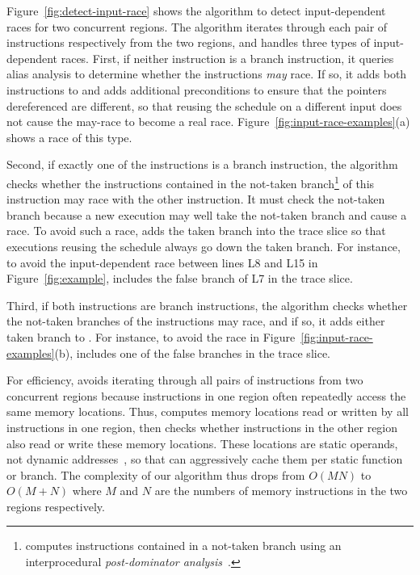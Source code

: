 Figure~\ref{fig:detect-input-race} shows the algorithm to detect
input-dependent races for two concurrent regions.  The algorithm iterates
through each pair of instructions respectively from the
two regions, and handles three types of input-dependent races.  First, if
neither instruction is a branch instruction, it queries alias analysis to
determine whether the instructions \emph{may} race.  If so, it adds both
instructions to  and adds additional
preconditions to ensure that the pointers dereferenced are different, so
that reusing the schedule on a different input does not cause the may-race
to become a real race.  Figure~\ref{fig:input-race-examples}(a) shows
a race of this type.

Second, if exactly one of the instructions is a branch instruction, the
algorithm checks whether the instructions contained in the not-taken
branch\footnote{\peregrine computes instructions contained in a not-taken
  branch using an interprocedural \emph{post-dominator
    analysis}~\cite{aho:dragon:06}.} of this instruction may race with the
other instruction.
It must check the not-taken branch because a new
execution may well take the not-taken branch and cause a race.  To avoid such a
race, \peregrine adds the taken branch into the trace slice so that executions
reusing the schedule always go down the taken branch.  For instance, to
avoid the input-dependent race between lines L8 and L15
in Figure~\ref{fig:example}, \peregrine includes
the false branch of L7 in the trace slice.

Third, if both instructions are branch instructions, the algorithm checks
whether the not-taken branches of the instructions may race, and if so, it
adds either taken branch to .
For instance, to avoid the race in Figure~\ref{fig:input-race-examples}(b),
\peregrine includes one of the false branches in the trace slice.

For efficiency, \peregrine avoids iterating through all pairs of instructions
from two concurrent regions because instructions in one region often
repeatedly access the same memory locations.  Thus, \peregrine computes memory
locations read or written by all instructions in one region, then checks
whether instructions in the other region also read or write these memory
locations.  These locations are static operands, not dynamic
addresses~\cite{rwset:tacas08}, so that \peregrine can aggressively cache them
per static function or branch.  The complexity of our algorithm thus drops from
$O(MN)$ to $O(M+N)$ where $M$ and $N$ are the numbers of memory
instructions in the two regions respectively.

